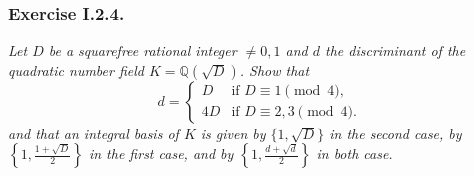 \documentclass{article}
\begin{document}



\subsubsection*{Exercise I.2.4.}
\emph{Let $D$ be a squarefree rational integer $\neq 0, 1$ and
$d$ the discriminant of the quadratic number field $K = \mathbb{Q}(\sqrt{D})$.
Show that
\begin{equation*}
  d = \begin{cases}
    D  & \text{if $D \equiv 1 \pmod 4$,}\\
    4D & \text{if $D \equiv 2, 3 \pmod 4$.}
  \end{cases}
\end{equation*}
and that an integral basis of $K$ is given by $\{1, \sqrt{D}\}$ in the second case,
by $\left\{ 1, \frac{1+\sqrt{D}}{2} \right\}$ in the first case,
and by $\left\{ 1, \frac{d+\sqrt{d}}{2} \right\}$ in both case.} \\
\end{document}
